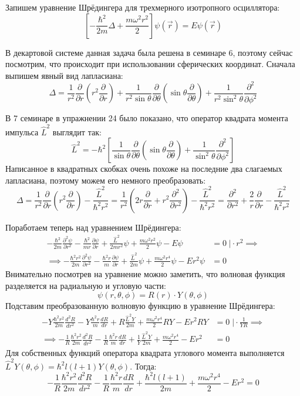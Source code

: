 Запишем уравнение Шрёдингера для трехмерного изотропного осциллятора:
\[
\left[-\frac{\hbar^2}{2m}\Delta + \frac{m\omega^2 r^2}{2}\right]\psi(\Vec{r}) = E\psi(\Vec{r})
\]

В декартовой системе данная задача была решена в семинаре 6, поэтому сейчас посмотрим, что происходит при использовании сферических координат. Сначала выпишем явный вид лапласиана:
\[
\Delta = \frac{1}{r^2}\frac{\partial}{\partial r}\left(r^2\frac{\partial}{\partial r}\right) + \frac{1}{r^2 \sin\theta}\frac{\partial}{\partial\theta}\left(\sin\theta\frac{\partial}{\partial\theta}\right) + \frac{1}{r^2\sin^2\theta}\frac{\partial^2}{\partial\phi^2}
\]

В 7 семинаре в упражнении 24 было показано, что оператор квадрата момента импульса $\hat{L}^2$ выглядит так:
\[
\hat{L}^2 = -\hbar^2\left[\frac{1}{\sin\theta}\frac{\partial}{\partial \theta}\left( \sin\theta\frac{\partial}{\partial \theta} \right) + \frac{1}{\sin^2\theta}\frac{\partial^2}{\partial\phi^2}\right]
\]
Написанное в квадратных скобках очень похоже на последние два слагаемых лапласиана, поэтому можем его немного преобразовать:
\[
\Delta = \frac{1}{r^2}\frac{\partial}{\partial r}\left(r^2\frac{\partial}{\partial r}\right) - \frac{\hat{L}^2}{\hbar^2 r^2} = \frac{1}{r^2}\left(2r\frac{\partial}{\partial r} + r^2 \frac{\partial^2}{\partial r^2}\right) - \frac{\hat{L}^2}{\hbar^2 r^2} = \frac{\partial^2}{\partial r^2} + \frac{2}{r}\frac{\partial}{\partial r} - \frac{\hat{L}^2}{\hbar^2 r^2}
\]

Поработаем теперь над уравнением Шрёдингера:
\begin{align*}
     -\frac{\hbar^2}{2m}\frac{\partial^2\psi}{\partial r^2} - \frac{\hbar^2}{mr}\frac{\partial\psi}{\partial r} + \frac{\hat{L}^2}{2mr^2}\psi + \frac{m\omega^2 r^2}{2}\psi - E\psi & = 0 \; \Bigg| \cdot r^2 \implies \\
    \implies -\frac{\hbar^2 r^2}{2m}\frac{\partial^2\psi}{\partial r^2} - \frac{\hbar^2 r}{m}\frac{\partial\psi}{\partial r} + \frac{\hat{L}^2}{2m}\psi + \frac{m\omega^2 r^4}{2}\psi - Er^2\psi & = 0
\end{align*}
Внимательно посмотрев на уравнение можно заметить, что волновая функция разделяется на радиальную и угловую части:
\[
\psi(r, \theta, \phi) = R(r) \cdot Y(\theta, \phi)
\]
Подставим преобразованную волновую функцию в уравнение Шрёдингера:
\begin{align*}
    -Y\frac{\hbar^2 r^2}{2m}\frac{d^2R}{dr^2} - Y\frac{\hbar^2 r}{m}\frac{dR}{dr} + R\frac{\hat{L}^2Y}{2m} + \frac{m\omega^2r^4}{2}RY - Er^2RY &= 0 \; \Bigg| \cdot \frac{1}{YR} \implies \\
    \implies -\frac{1}{R}\frac{\hbar^2 r^2}{2m}\frac{d^2R}{dr^2} - \frac{1}{R}\frac{\hbar^2r}{m}\frac{dR}{dr} + \frac{1}{Y}\frac{\hat{L}^2Y}{2m} + \frac{m\omega^2r^4}{2} - Er^2 &= 0
\end{align*}
Для собственных функций оператора квадрата углового момента выполняется $\hat{L}^2Y(\theta, \phi) = \hbar^2l(l+1)Y(\theta, \phi)$. Тогда:
\[
-\frac{1}{R}\frac{\hbar^2 r^2}{2m}\frac{d^2R}{dr^2} - \frac{1}{R}\frac{\hbar^2r}{m}\frac{dR}{dr} + \frac{\hbar^2 l(l+1)}{2m} + \frac{m\omega^2r^4}{2} - Er^2 = 0
\]

